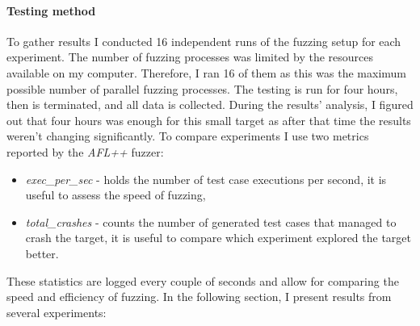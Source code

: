 \paragraph{Testing method}
To gather results I conducted 16 independent runs of the fuzzing setup for each experiment. The number of fuzzing processes was limited by the resources available on my computer. Therefore, I ran 16 of them as this was the maximum possible number of parallel fuzzing processes. The testing is run for four hours, then is terminated, and all data is collected. During the results' analysis, I figured out that four hours was enough for this small target as after that time the results weren't changing significantly. 
To compare experiments I use two metrics reported by the \textit{AFL++} fuzzer:
\begin{itemize}
    \item \textit{exec\_per\_sec} - holds the number of test case executions per second, it is useful to assess the speed of fuzzing,
    \item \textit{total\_crashes} - counts the number of generated test cases that managed to crash the target, it is useful to compare which experiment explored the target better.
\end{itemize}
These statistics are logged every couple of seconds and allow for comparing the speed and efficiency of fuzzing.
In the following section, I present results from several experiments:

